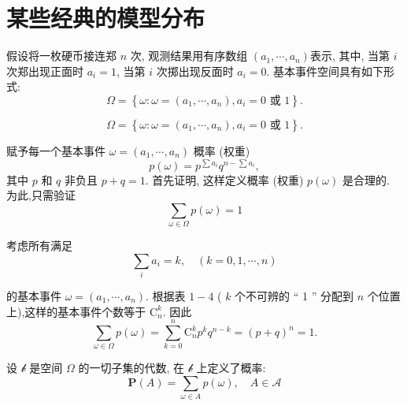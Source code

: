 \section{某些经典的模型分布}

 假设将一枚硬币接连郑 $n$ 次, 观测结果用有序数组 $\left(a_1, \cdots, a_n\right)$表示, 其中, 当第 $i$ 次郑出现正面时 $a_i=1$, 当第 $i$ 次掷出现反面时 $a_i=0$. 基本事件空间具有如下形式:
$$
\Omega=\left\{\omega: \omega=\left(a_1, \cdots, a_n\right), a_i=0 \text { 或 } 1\right\} .
$$

$$
\Omega=\left\{\omega: \omega=\left(a_1, \cdots, a_n\right), a_i=0 \text { 或 } 1\right\} .
$$

赋予每一个基本事件 $\omega=\left(a_1, \cdots, a_n\right)$ 概率 (权重)
$$
p(\omega)=p^{\sum a_i} q^{n-\sum a_i},
$$
其中 $p$ 和 $q$ 非负且 $p+q=1$. 首先证明, 这样定义概率 (权重) $p(\omega)$ 是合理的. 为此,只需验证
$$
\sum_{\omega \in \Omega} p(\omega)=1
$$

考虑所有满足
$$
\sum_i a_i=k, \quad(k=0,1, \cdots, n)
$$

的基本事件 $\omega=\left(a_1, \cdots, a_n\right)$. 根据表 $1-4$ ( $k$ 个不可辨的 `` 1 '' 分配到 $n$ 个位置上),这样的基本事件个数等于 $\mathrm{C}_n^k$. 因此
$$
\sum_{\omega \in \Omega} p(\omega)=\sum_{k=0}^n \mathrm{C}_n^k p^k q^{n-k}=(p+q)^n=1 .
$$

设 $\mathscr{b}$ 是空间 $\Omega$ 的一切子集的代数, 在 $\mathscr{b}$ 上定义了概率:
$$
\mathbf{P}(A)=\sum_{\omega \in A} p(\omega), \quad A \in \mathscr{A}
$$